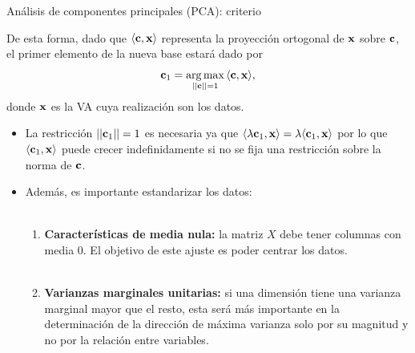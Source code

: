 \documentclass[9pt, handout]{beamer}
\begin{document}
\begin{frame}{Análisis de componentes principales (PCA): criterio}

De esta forma, dado que $\langle\mathbf{c},\mathbf{x}\rangle$ representa la proyección ortogonal de $\mathbf{x}$ sobre $\mathbf{c}$, el primer elemento de la nueva base estará dado por 
\begin{equation*}
	\mathbf{c}_1 = \operatorname*{arg\,max}_{||\mathbf{c}||=1} {\langle\mathbf{c},\mathbf{x}\rangle}, \label{eq:PCA_max}
\end{equation*} \pause
donde $\mathbf{x}$ es la VA cuya realización son los datos.


\begin{itemize}
	\item La restricción $||\mathbf{c}_1||=1$ es necesaria ya que $\langle\lambda\mathbf{c}_1,\mathbf{x}\rangle = \lambda\langle\mathbf{c}_1,\mathbf{x}\rangle$ por lo que $\langle\mathbf{c}_1,\mathbf{x}\rangle$ puede crecer indefinidamente si no se fija una restricción sobre la norma de $\mathbf{c}$. \pause
	\item Además, es importante estandarizar los datos:\\~\ \pause

	\begin{enumerate}
	\item \textbf{Características de media nula:} la matriz $X$ debe tener columnas con media $0$. El objetivo de este ajuste es poder centrar los datos.\\~\ \pause
	\item \textbf{Varianzas marginales unitarias:} si una dimensión tiene una varianza marginal mayor que el resto, esta será más importante en la determinación de la dirección de máxima varianza solo por su magnitud y no por la relación entre variables.
	\end{enumerate}
\end{itemize}

	
\end{frame}
\end{document}
